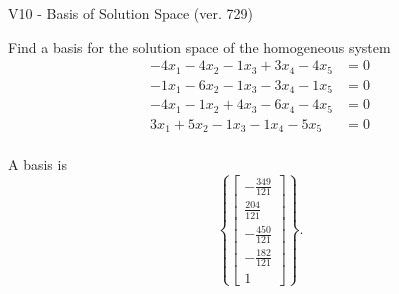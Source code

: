 \begin{exercise}
  \begin{exerciseTitle}V10 - Basis of Solution Space (ver. 729)\end{exerciseTitle}
  \begin{exerciseStatement}
    Find a basis for the solution space of the homogeneous system 
\begin{align*}
 -4 x_ 1 -4 x_ 2 -1 x_ 3 + 3 x_ 4 -4 x_ 5 &= 0  \\ 
  -1 x_ 1 -6 x_ 2 -1 x_ 3 -3 x_ 4 -1 x_ 5 &= 0  \\ 
  -4 x_ 1 -1 x_ 2 + 4 x_ 3 -6 x_ 4 -4 x_ 5 &= 0  \\ 
  3 x_ 1 + 5 x_ 2 -1 x_ 3 -1 x_ 4 -5 x_ 5 &= 0  \\ 
 \end{align*}


 
  \end{exerciseStatement}

  \begin{exerciseAnswer}
   A basis is   
\[\left\{\left[\begin{array}{c}
-\frac{349}{121} \\
\frac{204}{121} \\
-\frac{450}{121} \\
-\frac{182}{121} \\
1
\end{array}\right]\right\}.\]

  


  \end{exerciseAnswer}
\end{exercise}
